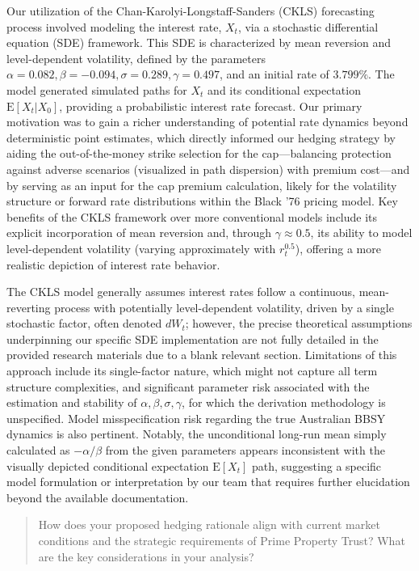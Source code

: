 \documentclass[11pt, a4paper, british]{article}
\begin{document}
Our utilization of the Chan-Karolyi-Longstaff-Sanders (CKLS) forecasting process involved modeling the interest rate, $X_t$, via a stochastic differential equation (SDE) framework. This SDE is characterized by mean reversion and level-dependent volatility, defined by the parameters $\alpha=0.082, \beta=-0.094, \sigma=0.289, \gamma=0.497$, and an initial rate of $3.799\%$. The model generated simulated paths for $X_t$ and its conditional expectation $\mathrm{E}[X_t | X_0]$, providing a probabilistic interest rate forecast. Our primary motivation was to gain a richer understanding of potential rate dynamics beyond deterministic point estimates, which directly informed our hedging strategy by aiding the out-of-the-money strike selection for the cap—balancing protection against adverse scenarios (visualized in path dispersion) with premium cost—and by serving as an input for the cap premium calculation, likely for the volatility structure or forward rate distributions within the Black '76 pricing model. Key benefits of the CKLS framework over more conventional models include its explicit incorporation of mean reversion and, through $\gamma \approx 0.5$, its ability to model level-dependent volatility (varying approximately with $r_t^{0.5}$), offering a more realistic depiction of interest rate behavior.

The CKLS model generally assumes interest rates follow a continuous, mean-reverting process with potentially level-dependent volatility, driven by a single stochastic factor, often denoted $dW_t$; however, the precise theoretical assumptions underpinning our specific SDE implementation are not fully detailed in the provided research materials due to a blank relevant section. Limitations of this approach include its single-factor nature, which might not capture all term structure complexities, and significant parameter risk associated with the estimation and stability of $\alpha, \beta, \sigma, \gamma$, for which the derivation methodology is unspecified. Model misspecification risk regarding the true Australian BBSY dynamics is also pertinent. Notably, the unconditional long-run mean simply calculated as $-\alpha/\beta$ from the given parameters appears inconsistent with the visually depicted conditional expectation $\mathrm{E}[X_t]$ path, suggesting a specific model formulation or interpretation by our team that requires further elucidation beyond the available documentation.

\newpage

\begin{quote}
    How does your proposed hedging rationale align with current market conditions and the strategic requirements of Prime Property Trust? What are the key considerations in your analysis?
\end{quote}
\end{document}
